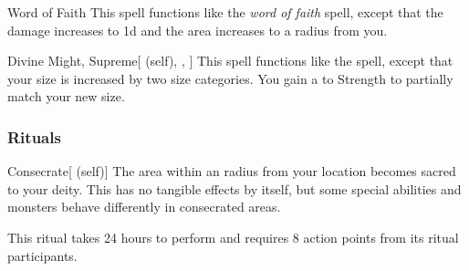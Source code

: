 \lowercase{\hypertarget{spell:Word of Faith}{}}\label{spell:Word of Faith}
\begin{freeability}[\nth{6}]{\hypertarget{spell:Word of Faith}{Word of Faith}}
This spell functions like the \textit{word of faith} spell, except that the damage increases to  \plus1d and the area increases to a \arealarge radius from you.
\end{freeability}
\vspace{0.25em}



\lowercase{\hypertarget{spell:Divine Might, Supreme}{}}\label{spell:Divine Might, Supreme}
\begin{attuneability}[\nth{7}]{\hypertarget{spell:Divine Might, Supreme}{Divine Might, Supreme}}[ (self), , ]
This spell functions like the  spell, except that your size is increased by two size categories.
You gain a   to Strength to partially match your new size.
\end{attuneability}
\vspace{0.25em}



\subsubsection{Rituals}


\lowercase{\hypertarget{spell:Consecrate}{}}\label{spell:Consecrate}
\begin{attuneability}[\nth{2}]{\hypertarget{spell:Consecrate}{Consecrate}}[ (self)]
The area within an \arealarge radius  from your location becomes sacred to your deity.
This has no tangible effects by itself, but some special abilities and monsters behave differently in consecrated areas.

This ritual takes 24 hours to perform and requires 8 action points from its ritual participants.
\end{attuneability}
\vspace{0.25em}



